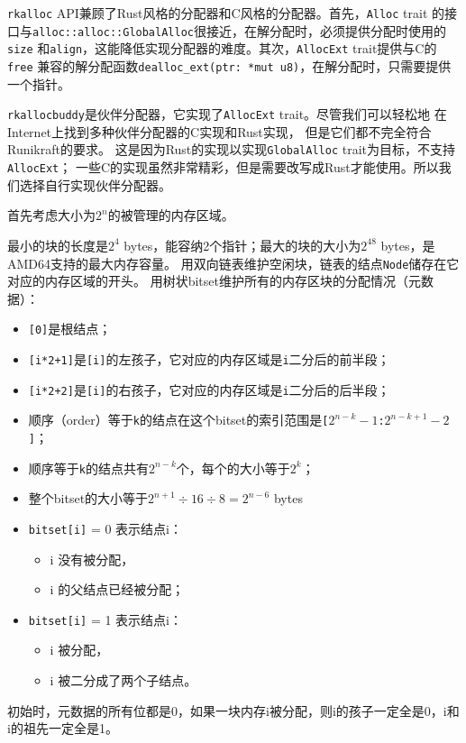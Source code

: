 \documentclass{../runikraft-report}
\begin{document}
\texttt{rkalloc} API兼顾了Rust风格的分配器和C风格的分配器。首先，\texttt{Alloc} trait
的接口与\texttt{alloc::alloc::GlobalAlloc}很接近，在解分配时，必须提供分配时使用的\texttt{size}
和\texttt{align}，这能降低实现分配器的难度。其次，\texttt{AllocExt} trait提供与C的\texttt{free}
兼容的解分配函数\texttt{dealloc\_ext(ptr: *mut u8)}，在解分配时，只需要提供一个指针。

\texttt{rkallocbuddy}是伙伴分配器，它实现了\texttt{AllocExt} trait。尽管我们可以轻松地
在Internet上找到多种伙伴分配器的C实现\cite{bib:buddy-C-1}\cite{bib:buddy-C-2}\cite{bib:buddy-C-3}和Rust实现\cite{bib:buddy-Rust-1}\cite{bib:buddy-Rust-2}\cite{bib:buddy-Rust-3}，
但是它们都不完全符合Runikraft的要求。
这是因为Rust的实现以实现\texttt{GlobalAlloc} trait为目标，不支持\texttt{AllocExt}；
一些C的实现虽然非常精彩，但是需要改写成Rust才能使用。所以我们选择自行实现伙伴分配器。

首先考虑大小为$2^n$的被管理的内存区域。

最小的块的长度是$2^4$ bytes，能容纳2个指针；最大的块的大小为$2^{48}$ bytes，是AMD64支持的最大内存容量。
用双向链表维护空闲块，链表的结点\texttt{Node}储存在它对应的内存区域的开头。
用树状bitset维护所有的内存区块的分配情况（元数据）：
\begin{itemize}
\item \texttt{[0]}是根结点；
\item \texttt{[i*2+1]}是\texttt{[i]}的左孩子，它对应的内存区域是\texttt{i}二分后的前半段；
\item \texttt{[i*2+2]}是\texttt{[i]}的右孩子，它对应的内存区域是\texttt{i}二分后的后半段；
\item 顺序（order）等于\texttt{k}的结点在这个bitset的索引范围是\texttt{[$2^{n-k}-1$:$2^{n-k+1}-2$]}；
\item 顺序等于\texttt{k}的结点共有$2^{n-k}$个，每个的大小等于$2^k$；
\item 整个bitset的大小等于$2^{n+1}\div16\div8=2^{n-6}$ bytes
\item \texttt{bitset[i]} = 0 表示结点i：
    \begin{itemize}
        \item i 没有被分配，
        \item i 的父结点已经被分配；
    \end{itemize}
\item \texttt{bitset[i]} = 1 表示结点i：
    \begin{itemize}
        \item i 被分配，
        \item i 被二分成了两个子结点。
    \end{itemize}
\end{itemize}
初始时，元数据的所有位都是0，如果一块内存i被分配，则i的孩子一定全是0，i和i的祖先一定全是1。
\end{document}
